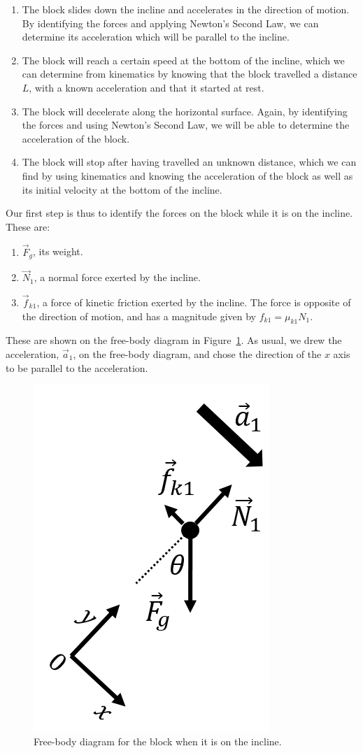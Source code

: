 \begin{framed}
\begin{framed}
\begin{enumerate}
\item The block slides down the incline and accelerates in the direction of motion. By identifying the forces and applying Newton's Second Law, we can determine its acceleration which will be parallel to the incline.
\item The block will reach a certain speed at the bottom of the incline, which we can determine from kinematics by knowing that the block travelled a distance $L$, with a known acceleration and that it started at rest.
\item The block will decelerate along the horizontal surface. Again, by identifying the forces and using Newton's Second Law, we will be able to determine the acceleration of the block.
\item The block will stop after having travelled an unknown distance, which we can find by using kinematics and knowing the acceleration of the block as well as its initial velocity at the bottom of the incline.
\end{enumerate}

Our first step is thus to identify the forces on the block while it is on the incline. These are:

\begin{enumerate}
\item $\vec F_{g}$, its weight.
\item $\vec N_1$, a normal force exerted by the incline.
\item $\vec f_{k1}$, a force of kinetic friction exerted by the incline. The force is opposite of the direction of motion, and has a magnitude given by $f_{k1}=\mu_{k1}N_1$.
\end{enumerate}

These are shown on the free-body diagram in Figure~\ref{fig:applyingnewtonslaws:blockI_fbd1}. As usual, we drew the acceleration, $\vec a_1$, on the free-body diagram, and chose the direction of the $x$ axis to be parallel to the acceleration.

\begin{figure}[!htbp]
\centering
\includegraphics[width=0.25\linewidth]{files/blockI_fbd1-ef908fa1c7223f0c653ddd2f630b7890.png}
\caption[]{Free-body diagram for the block when it is on the incline.}
\label{fig:applyingnewtonslaws:blockI_fbd1}
\end{figure}


\end{framed}
\end{framed}
